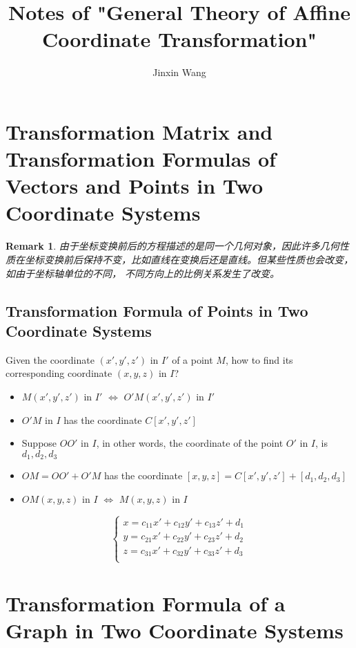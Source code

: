 \documentclass[onecolumn]{ctexart}
\title{Notes of "General Theory of Affine Coordinate Transformation"}
\author{Jinxin Wang}
\date{}
\newtheorem{remark}{Remark}
\begin{document}
\maketitle

\section{Transformation Matrix and Transformation Formulas of Vectors and Points in Two Coordinate Systems}

\begin{remark}
  由于坐标变换前后的方程描述的是同一个几何对象，因此许多几何性质在坐标变换前后保持不变，比如直线在变换后还是直线。但某些性质也会改变，如由于坐标轴单位的不同，
  不同方向上的比例关系发生了改变。
\end{remark}

\subsection{Transformation Formula of Points in Two Coordinate Systems}

Given the coordinate $(x', y', z')$ in $I'$ of a point $M$, how to find its 
corresponding coordinate $(x, y, z)$ in $I$?
\begin{itemize}
  \item $M (x', y', z')$ in $I'$ $\Leftrightarrow$ $O'M (x', y', z')$ in $I'$
  \item $O'M$ in $I$ has the coordinate $C [x', y', z']$
  \item Suppose $OO'$ in $I$, in other words, the coordinate of the point $O'$ in $I$, is $d_1, d_2, d_3$
  \item $OM = OO' + O'M$ has the coordinate $[x, y, z] = C [x', y', z'] + [d_1, d_2, d_3]$
  \item $OM(x, y, z)$ in $I$ $\Leftrightarrow$ $M (x, y, z)$ in $I$
\end{itemize}

\begin{equation}
  \begin{cases}
    x = c_{11} x' + c_{12} y' + c_{13} z' + d_1 \\
    y = c_{21} x' + c_{22} y' + c_{23} z' + d_2 \\
    z = c_{31} x' + c_{32} y' + c_{33} z' + d_3 \\
  \end{cases}
\end{equation}

\section{Transformation Formula of a Graph in Two Coordinate Systems}
\end{document}
